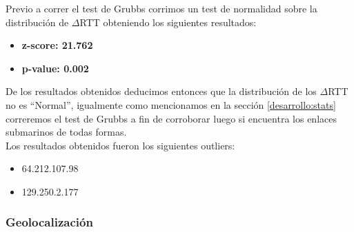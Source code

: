 Previo a correr el test de Grubbs corrimos un test de normalidad sobre la distribución de $\Delta$RTT obteniendo los siguientes resultados:

\begin{itemize}
\item \textbf{z-score: 21.762}
\item \textbf{p-value: 0.002}
\end{itemize}

De los resultados obtenidos deducimos entonces que la distribución de los $\Delta$RTT no es ``Normal'', igualmente como mencionamos en la sección \ref{desarrollo:stats} correremos el test de Grubbs a fin de corroborar luego si encuentra los enlaces submarinos de todas formas.\\
Los resultados obtenidos fueron los siguientes outliers:

\begin{itemize}
\item 64.212.107.98
\item 129.250.2.177
\end{itemize}

\subsubsection{Geolocalización}

